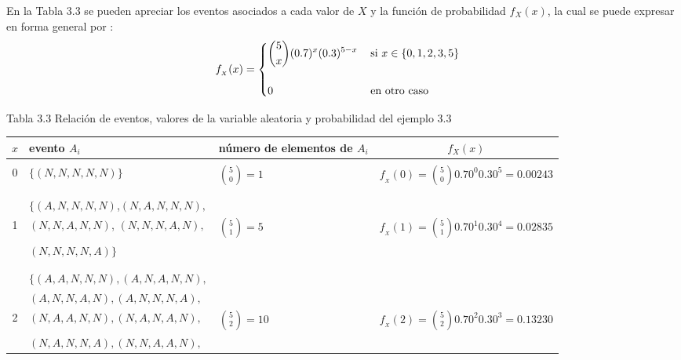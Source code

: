 \documentclass[base=hide,12pt]{elegantbook}
\begin{document}
\begin{itemize}
\vspace{1cm}	
En  la Tabla 3.3 se  pueden apreciar los eventos asociados a cada valor de $X$ y la función de probabilidad $f_{X}(x)$, la cual se puede expresar en forma general por :
\vspace{1cm}
	$$ f_{_X}(x)= 
	\begin{cases}
		\displaystyle\binom{5}{x}(0.7)^{x}(0.3)^{5-x} \hspace{.3cm}\textnormal{ si } x \in \{0,1,2,3,5\}\\
		\\
		0 \hspace{3cm} \textnormal{ en otro caso }
	\end{cases} 
	$$
	\newpage 
\begin{center}
Tabla 3.3 Relación de eventos, valores de la variable aleatoria y probabilidad del ejemplo 3.3 \\	
{\footnotesize 
\begin{tabular}{cp{6cm}p{2.5cm}c}
				\hline %
				$x$ & evento $A_{i}$ & número de elementos de $A_{i}$ & $f_{X}(x)$\\	
				\hline
				&&&\\
				$0$ & 
				$\{(N,N,N,N,N)\}$ & 
				$\displaystyle\binom{5}{0}=1$ & 
				$f_{_X}(0) = \displaystyle\binom{5}{0} 0.70^{0} 0.30^{5} =0.00243$ \\
				&&&\\ %
				&&&\\
				& $\{(A,N,N,N,N)$,$(N,A,N,N,N),$ && \\
				1 & $(N,N,A,N,N)$, $(N,N,N,A,N),$  & $\displaystyle\binom{5}{1}=5$ & $f_{_X}(1) =  \displaystyle\binom{5}{1} 0.70^{1} 0.30^{4} =0.02835$\\
				& $(N,N,N,N,A) \}$  &&\\          
				&&&\\ 
				&&&\\
				& $\{(A,A,N,N,N),(A,N,A,N,N),$ &                   & \\
				& $(A,N,N,A,N),(A,N,N,N,A),$    &                   & \\
				2 & $(N,A,A,N,N),(N,A,N,A,N),$    & $\displaystyle\binom{5}{2}=10$ & $f_{_X}(2)=\displaystyle\binom{5}{2} 0.70^{2} 0.30^{3}=0.13230$\\
				& $(N,A,N,N,A),(N,N,A,A,N),$    &                   & \\

\end{tabular}}
\end{center}
\end{itemize}
\end{document}
